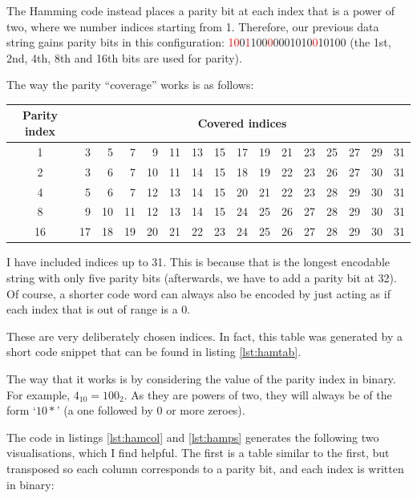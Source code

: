 \documentclass{article}
\begin{document}
    The Hamming code instead places a parity bit at each index that is a power
    of two, where we number indices starting from 1. Therefore, our previous
    data string gains parity bits in this configuration:
    \textcolor{red}{10}0\textcolor{red}{1}100\textcolor{red}{0}0001010\textcolor{red}{0}10100
    (the 1st, 2nd, 4th, 8th and 16th bits are used for parity).

    The way the parity ``coverage'' works is as follows:

\begin{center}
    \begin{tabular}{crrrrrrrrrrrrrrr}
    \toprule
    Parity index & \multicolumn{15}{c}{Covered indices} \\
    \midrule
    1 & 3 & 5 & 7 & 9 & 11 & 13 & 15 & 17 & 19 & 21 & 23 & 25 & 27 & 29 & 31 \\
    2 & 3 & 6 & 7 & 10 & 11 & 14 & 15 & 18 & 19 & 22 & 23 & 26 & 27 & 30 & 31 \\
    4 & 5 & 6 & 7 & 12 & 13 & 14 & 15 & 20 & 21 & 22 & 23 & 28 & 29 & 30 & 31 \\
    8 & 9 & 10 & 11 & 12 & 13 & 14 & 15 & 24 & 25 & 26 & 27 & 28 & 29 & 30 & 31 \\
    16 & 17 & 18 & 19 & 20 & 21 & 22 & 23 & 24 & 25 & 26 & 27 & 28 & 29 & 30 & 31 \\
    \bottomrule
    \end{tabular}
\end{center}

    I have included indices up to 31. This is because that is the longest
    encodable string with only five parity bits (afterwards, we have to add a
    parity bit at 32). Of course, a shorter code word can always also be encoded
    by just acting as if each index that is out of range is a 0.

    These are very deliberately chosen indices. In fact, this table was
    generated by a short code snippet that can be found in listing
    \ref{lst:hamtab}.

    The way that it works is by considering the value of the parity index in
    binary. For example, $4_{10}=100_{2}$. As they are powers of two, they will
    always be of the form `$10*$' (a one followed by 0 or more zeroes).

    The code in listings \ref{lst:hamcol} and \ref{lst:hamps} generates the
    following two visualisations, which I find helpful. The first is a table
    similar to the first, but transposed so each column corresponds to a parity
    bit, and each index is written in binary:
\end{document}
